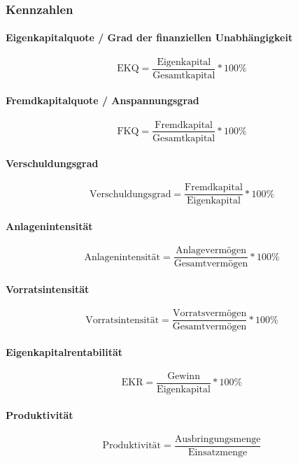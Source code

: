 \documentclass[titlepage,parskip=half]{scrartcl}
\begin{document}
\subsubsection{Kennzahlen}

\paragraph{Eigenkapitalquote / Grad der finanziellen Unabhängigkeit}
$$ \textrm{EKQ} = \frac{\textrm{Eigenkapital}}{\textrm{Gesamtkapital}} * 100\% $$

\paragraph{Fremdkapitalquote / Anspannungsgrad}
$$ \textrm{FKQ} = \frac{\textrm{Fremdkapital}}{\textrm{Gesamtkapital}} * 100\% $$

\paragraph{Verschuldungsgrad}
$$ \textrm{Verschuldungsgrad} = \frac{\textrm{Fremdkapital}}{\textrm{Eigenkapital}} * 100\% $$

\paragraph{Anlagenintensität}
$$ \textrm{Anlagenintensität} = \frac{\textrm{Anlagevermögen}}{\textrm{Gesamtvermögen}} * 100\% $$

\paragraph{Vorratsintensität}
$$ \textrm{Vorratsintensität} = \frac{\textrm{Vorratsvermögen}}{\textrm{Gesamtvermögen}} * 100\% $$

\paragraph{Eigenkapitalrentabilität}
$$ \textrm{EKR} = \frac{\textrm{Gewinn}}{\textrm{Eigenkapital}} * 100\% $$

\paragraph{Produktivität}
$$ \textrm{Produktivität} = \frac{\textrm{Ausbringungsmenge}}{\textrm{Einsatzmenge}} $$
\end{document}
